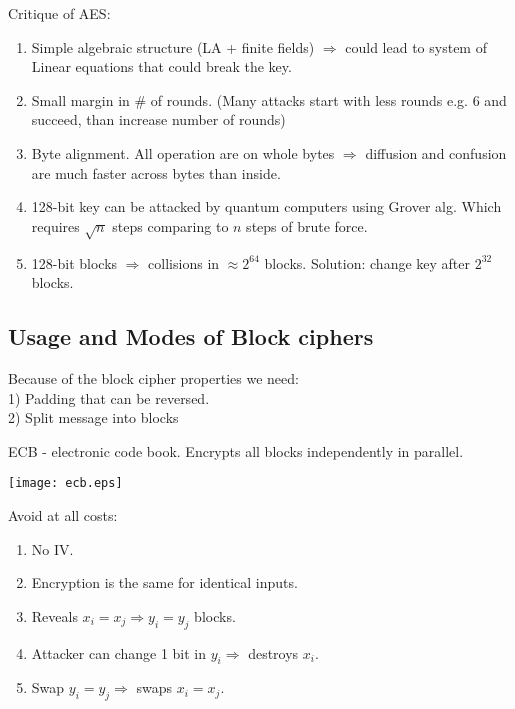 Critique of AES:
\begin{enumerate}
	\item Simple algebraic structure (LA + finite fields) $\Rightarrow$ could lead to system of Linear equations that could break the key.
	\item Small margin in \# of rounds. (Many attacks start with less rounds e.g. 6 and succeed, than increase number of rounds)
	\item Byte alignment. All operation are on whole bytes $\Rightarrow$ diffusion and confusion are much faster across bytes than inside.
	\item 128-bit key can be attacked by quantum computers using Grover alg. Which requires $\sqrt{n}$ steps comparing to $n$ steps of brute force.
	\item 128-bit blocks $\Rightarrow$ collisions in $\approx 2^{64}$ blocks.
		Solution: change key after $2^{32}$ blocks.
\end{enumerate}

\subsection{Usage and Modes of Block ciphers}

Because of the block cipher properties we need:\\
1) Padding that can be reversed.\\
2) Split message into blocks

\begin{definition}
	ECB - electronic code book. Encrypts all blocks independently in parallel.

	\texttt{[image: ecb.eps]}

	Avoid at all costs:
\begin{enumerate}
	\item No IV.
	\item Encryption is the same for identical inputs.
	\item Reveals $x_i = x_j \Rightarrow y_i = y_j$ blocks.
	\item Attacker can change 1 bit in $y_i \Rightarrow$ destroys $x_i$.
	\item Swap $y_i = y_j \Rightarrow$ swaps $x_i = x_j$.
\end{enumerate}
\end{definition}

